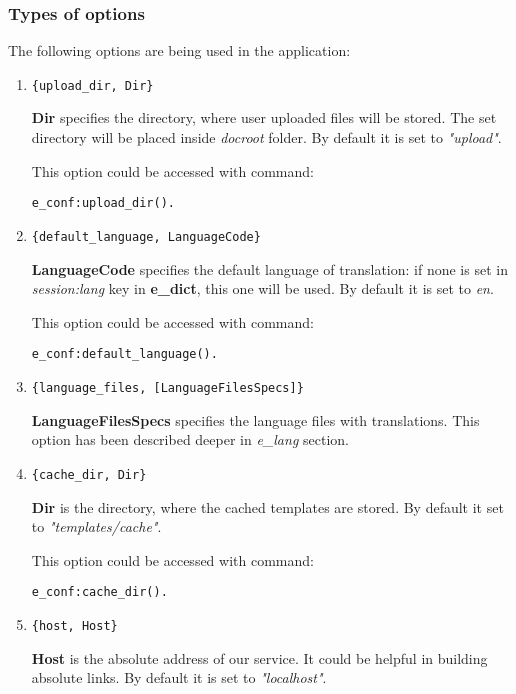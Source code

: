 \subsubsection{Types of options} The following options are being used in the application:
\begin{enumerate}
\item 
\begin{verbatim}
{upload_dir, Dir}
\end{verbatim}

{\bf Dir} specifies the directory, where user uploaded files will be stored. The set directory will be placed inside {\it docroot} folder. By default it is set to {\it "upload"}.

This option could be accessed with command:
\begin{verbatim}
e_conf:upload_dir().
\end{verbatim}

\item
\begin{verbatim}
{default_language, LanguageCode}
\end{verbatim}
{\bf LanguageCode} specifies the default language of translation: if none is set in {\it session:lang} key in {\bf e\_dict}, this one will be used. By default it is set to {\it en}.

This option could be accessed with command: 
\begin{verbatim}
e_conf:default_language().
\end{verbatim}

\item
\begin{verbatim}
{language_files, [LanguageFilesSpecs]}
\end{verbatim}
{\bf LanguageFilesSpecs} specifies the language files with translations. This option has been described deeper in {\it e\_lang} section. 

\item
\begin{verbatim}
{cache_dir, Dir}
\end{verbatim}
{\bf Dir} is the directory, where the cached templates are stored. By default it set to {\it "templates/cache"}.

This option could be accessed with command: 
\begin{verbatim}
e_conf:cache_dir().
\end{verbatim}

\item
\begin{verbatim}
{host, Host}
\end{verbatim}
{\bf Host} is the absolute address of our service. It could be helpful in building absolute links. By default it is set to {\it "localhost"}.


\end{enumerate}
